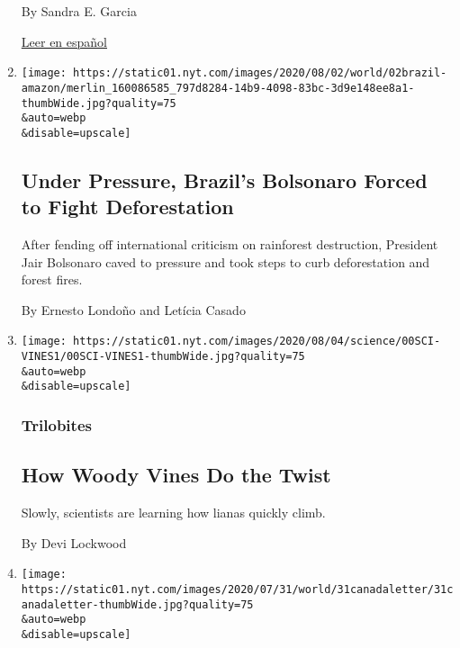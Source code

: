 \begin{enumerate}
  By Sandra E. Garcia

  \href{https://www.nytimes.com/es/2020/08/03/espanol/cultura/victor-victor-murio-coronavirus.html}{Leer
  en español}
\item
  \href{/2020/08/01/world/americas/Brazil-amazon-deforestation-bolsonaro.html}{}

  \texttt{[image: https://static01.nyt.com/images/2020/08/02/world/02brazil-amazon/merlin\_160086585\_797d8284-14b9-4098-83bc-3d9e148ee8a1-thumbWide.jpg?quality=75\\\&auto=webp\\\&disable=upscale]}

  \hypertarget{under-pressure-brazils-bolsonaro-forced-to-fight-deforestation}{%
  \subsection{Under Pressure, Brazil's Bolsonaro Forced to Fight
  Deforestation}\label{under-pressure-brazils-bolsonaro-forced-to-fight-deforestation}}

  After fending off international criticism on rainforest destruction,
  President Jair Bolsonaro caved to pressure and took steps to curb
  deforestation and forest fires.

  By Ernesto Londoño and Letícia Casado
\item
  \href{/2020/08/01/science/vines-lianas-panama.html}{}

  \texttt{[image: https://static01.nyt.com/images/2020/08/04/science/00SCI-VINES1/00SCI-VINES1-thumbWide.jpg?quality=75\\\&auto=webp\\\&disable=upscale]}

  \hypertarget{trilobites}{%
  \subsubsection{Trilobites}\label{trilobites}}

  \hypertarget{how-woody-vines-do-the-twist}{%
  \subsection{How Woody Vines Do the
  Twist}\label{how-woody-vines-do-the-twist}}

  Slowly, scientists are learning how lianas quickly climb.

  By Devi Lockwood
\item
  \href{/2020/07/31/world/canada/leone-farrell-chemist.html}{}

  \texttt{[image: https://static01.nyt.com/images/2020/07/31/world/31canadaletter/31canadaletter-thumbWide.jpg?quality=75\\\&auto=webp\\\&disable=upscale]}


\end{enumerate}
